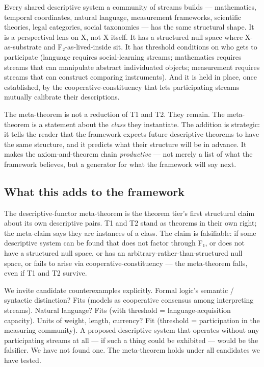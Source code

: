 \documentclass[11pt, openany]{book}
\begin{document}
Every shared descriptive system a community of streams builds --- mathematics, temporal coordinates, natural language, measurement frameworks, scientific theories, legal categories, social taxonomies --- has the same structural shape. It is a perspectival lens on X, not X itself. It has a structured null space where X-as-substrate and F₂-as-lived-inside sit. It has threshold conditions on who gets to participate (language requires social-learning streams; mathematics requires streams that can manipulate abstract individuated objects; measurement requires streams that can construct comparing instruments). And it is held in place, once established, by the cooperative-constituency that lets participating streams mutually calibrate their descriptions.

The meta-theorem is not a reduction of T1 and T2. They remain. The meta-theorem is a statement about the \textit{class} they instantiate. The addition is strategic: it tells the reader that the framework expects future descriptive theorems to have the same structure, and it predicts what their structure will be in advance. It makes the axiom-and-theorem chain \textit{productive} --- not merely a list of what the framework believes, but a generator for what the framework will say next.

\subsection{What this adds to the framework}

The descriptive-functor meta-theorem is the theorem tier's first structural claim about its own descriptive pairs. T1 and T2 stand as theorems in their own right; the meta-claim says they are instances of a class. The claim is falsifiable: if some descriptive system can be found that does not factor through F₁, or does not have a structured null space, or has an arbitrary-rather-than-structured null space, or fails to arise via cooperative-constituency --- the meta-theorem falls, even if T1 and T2 survive.

We invite candidate counterexamples explicitly. Formal logic's semantic / syntactic distinction? Fits (models as cooperative consensus among interpreting streams). Natural language? Fits (with threshold = language-acquisition capacity). Units of weight, length, currency? Fit (threshold = participation in the measuring community). A proposed descriptive system that operates without any participating streams at all --- if such a thing could be exhibited --- would be the falsifier. We have not found one. The meta-theorem holds under all candidates we have tested.
\end{document}
